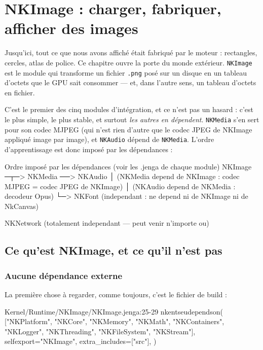 \chapter{NKImage : charger, fabriquer, afficher des images}

Jusqu'ici, tout ce que nous avons affiché était fabriqué par le moteur :
rectangles, cercles, atlas de police. Ce chapitre ouvre la porte du monde
extérieur. \texttt{NKImage} est le module qui transforme un fichier
\texttt{.png} posé sur un disque en un tableau d'octets que le GPU sait
consommer — et, dans l'autre sens, un tableau d'octets en fichier.

C'est le premier des cinq modules d'intégration, et ce n'est pas un hasard :
c'est le plus simple, le plus stable, et surtout \emph{les autres en dépendent}.
\texttt{NKMedia} s'en sert pour son codec MJPEG (qui n'est rien d'autre que le
codec JPEG de NKImage appliqué image par image), et \texttt{NKAudio} dépend de
\texttt{NKMedia}. L'ordre d'apprentissage est donc imposé par les dépendances :

\begin{nkcode}{Ordre imposé par les dépendances (voir les .jenga de chaque module)}
NKImage  ─┬─> NKMedia ──> NKAudio
          │      (NKMedia depend de NKImage : codec MJPEG = codec JPEG de NKImage)
          │      (NKAudio depend de NKMedia : decodeur Opus)
          └─> NKFont     (independant : ne depend ni de NKImage ni de NkCanvas)

NKNetwork (totalement independant — peut venir n'importe ou)
\end{nkcode}

\section{Ce qu'est NKImage, et ce qu'il n'est pas}

\subsection{Aucune dépendance externe}

La première chose à regarder, comme toujours, c'est le fichier de build :

\begin{nkcode}{Kernel/Runtime/NKImage/NKImage.jenga:25-29}
    nkentseudependson(
        ["NKPlatform", "NKCore", "NKMemory", "NKMath", "NKContainers", "NKLogger", "NKThreading", "NKFileSystem", "NKStream"],
        selfexport="NKImage",
        extra_includes=["src"],
    )
\end{nkcode}

